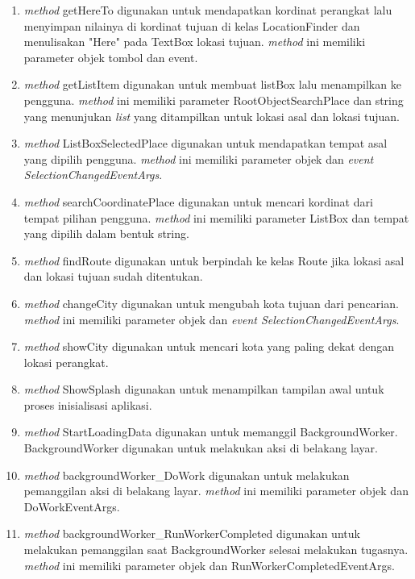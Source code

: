 \begin{enumerate}
	\item \textit{method} getHereTo digunakan untuk mendapatkan kordinat perangkat lalu menyimpan nilainya di kordinat tujuan di kelas LocationFinder dan menulisakan "Here" pada TextBox lokasi tujuan. \textit{method} ini memiliki parameter objek tombol dan event.
	\item \textit{method} getListItem digunakan untuk membuat listBox lalu menampilkan ke pengguna. \textit{method} ini memiliki parameter RootObjectSearchPlace dan string yang menunjukan \textit{list} yang ditampilkan untuk lokasi asal dan lokasi tujuan. 
	\item \textit{method} ListBoxSelectedPlace digunakan untuk mendapatkan tempat asal yang dipilih pengguna. \textit{method} ini memiliki parameter objek dan \textit{event SelectionChangedEventArgs}. 
	\item \textit{method} searchCoordinatePlace digunakan untuk mencari kordinat dari tempat pilihan pengguna. \textit{method} ini memiliki parameter ListBox dan tempat yang dipilih dalam bentuk string.
	\item \textit{method} findRoute digunakan untuk berpindah ke kelas Route jika lokasi asal dan lokasi tujuan sudah ditentukan.
	\item \textit{method} changeCity digunakan untuk mengubah kota tujuan dari pencarian. \textit{method} ini memiliki parameter objek dan \textit{event SelectionChangedEventArgs}.
	\item \textit{method} showCity digunakan untuk mencari kota yang paling dekat dengan lokasi perangkat.
	\item \textit{method} ShowSplash digunakan untuk menampilkan tampilan awal untuk proses inisialisasi aplikasi.
	\item \textit{method} StartLoadingData digunakan untuk memanggil BackgroundWorker. BackgroundWorker digunakan untuk melakukan aksi di belakang layar.
	\item \textit{method} backgroundWorker\_DoWork digunakan untuk melakukan pemanggilan aksi di belakang layar. \textit{method} ini memiliki parameter objek dan DoWorkEventArgs.
	\item \textit{method} backgroundWorker\_RunWorkerCompleted digunakan untuk melakukan pemanggilan saat BackgroundWorker selesai melakukan tugasnya. \textit{method} ini memiliki parameter objek dan RunWorkerCompletedEventArgs.
\end{enumerate}

